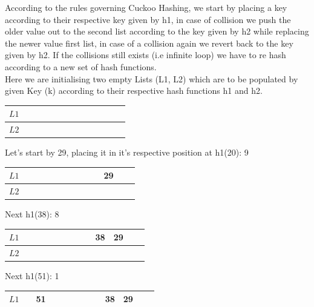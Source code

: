 \documentclass[addpoints]{exam}
\begin{document}
\begin{solution}
According to the rules governing Cuckoo Hashing, we start by placing a key according to their respective key given by h1, in case of collision we push the older value out to the second list according to the key given by h2 while replacing the newer value  first list, in case of a collision again we revert back to the key given by h2. If the collisions still exists (i.e infinite loop) we have to re hash according to a new set of hash functions.\\
Here we are initialising two empty Lists (L1, L2) which are to be populated by given Key (k) according to their respective hash functions h1 and h2.\\
\begin{center}
      \begin{tabular}{|l||*{12}{c|}}
        \hline
        $L1$  &  &  &  &  &  &  &  &   &   &   \\\hline
        $L2$  &  &  &  &  &  &  &  &   &   &   \\\hline
      \end{tabular}
    \end{center}
    Let's start by 29, placing it in it's respective position at h1(20): 9\\
    \begin{center}
      \begin{tabular}{|l||*{12}{c|}}
        \hline
        $L1$  &  &  &  &  &  &  &  &   &   & 29  \\\hline
        $L2$  &  &  &  &  &  &  &  &   &   &   \\\hline
      \end{tabular}
    \end{center}
    Next h1(38): 8\\
    \begin{center}
      \begin{tabular}{|l||*{12}{c|}}
        \hline
        $L1$  &  &  &  &  &  &  &  &   & 38  & 29  \\\hline
        $L2$  &  &  &  &  &  &  &  &   &   &   \\\hline
      \end{tabular}
    \end{center}
    Next h1(51): 1\\
     \begin{center}
      \begin{tabular}{|l||*{12}{c|}}
        \hline
        $L1$  &  & 51 &  &  &  &  &  &   & 38  & 29  \\\hline

\end{tabular}
\end{center}
\end{solution}
\end{document}
